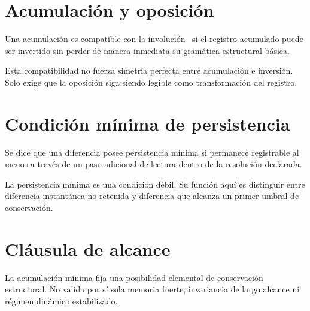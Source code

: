 \section{Acumulación y oposición}
\begin{definition}
Una acumulación es compatible con la involución \Iop\ si el registro acumulado puede ser invertido sin perder de manera inmediata su gramática estructural básica.
\end{definition}

\begin{observation}
Esta compatibilidad no fuerza simetría perfecta entre acumulación e inversión. Solo exige que la oposición siga siendo legible como transformación del registro.
\end{observation}

\section{Condición mínima de persistencia}
\begin{definition}
Se dice que una diferencia posee persistencia mínima si permanece registrable al menos a través de un paso adicional de lectura dentro de la resolución declarada.
\end{definition}

\begin{observation}
La persistencia mínima es una condición débil. Su función aquí es distinguir entre diferencia instantánea no retenida y diferencia que alcanza un primer umbral de conservación.
\end{observation}

\section{Cláusula de alcance}
\begin{observation}
La acumulación mínima fija una posibilidad elemental de conservación estructural. No valida por sí sola memoria fuerte, invariancia de largo alcance ni régimen dinámico estabilizado.
\end{observation}

